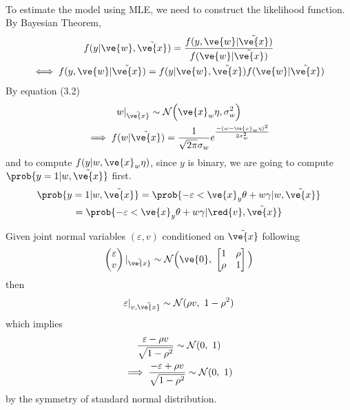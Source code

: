 \documentclass[11pt]{article}
\begin{document}
			\paragraph{}To estimate the model using MLE, we need to construct the likelihood function. By Bayesian Theorem,  
			\begin{gather}
				f(y|\ve{w}, \tilde{\ve{x}}) = \frac{f(y, \ve{w}|\tilde{\ve{x}})}{f(\ve{w}|\tilde{\ve{x}})} \\
				\iff f(y, \ve{w} | \tilde{\ve{x}}) = f(y|\ve{w}, \tilde{\ve{x}}) f(\ve{w}|\tilde{\ve{x}})
			\end{gather}
			By equation (3.2)
			\begin{gather}
				w|_{\tilde{\ve{x}}} \sim \mc{N} \Big(\ve{x}_w \eta, \sigma_w^2 \Big) \\
				\implies f(w|\tilde{\ve{x}}) = \frac{1}{\sqrt{2\pi}\sigma_w}e^{\frac{-(w - \ve{x}_w \eta)^2}{2\sigma_w^2}}
			\end{gather}
			and to compute $f(y|w, \ve{x}_w \eta)$, since $y$ is binary, we are going to compute $\prob{y=1|w, \tilde{\ve{x}}}$ first.
			\begin{gather}
				\prob{y=1|w, \tilde{\ve{x}}} = \prob{-\varepsilon < \ve{x}_y \theta + w \gamma | w, \tilde{\ve{x}}} \\
				= \prob{-\varepsilon < \ve{x}_y \theta + w \gamma | \red{v}, \tilde{\ve{x}}}
			\end{gather}
			\begin{lemma}
				Given joint normal variables $(\varepsilon, v)$ conditioned on $\tilde{\ve{x}}$ following
				\begin{equation}
					\begin{pmatrix} \varepsilon \\ v \end{pmatrix}\vert_{\tilde{\ve{x}}}
					\sim \mc{N}
					\Big(
					\ve{0},\ 
					\begin{bmatrix}1 & \rho \\ 
					\rho & 1\end{bmatrix}
					\Big)
				\end{equation}
				then 
				\begin{equation}
					\varepsilon|_{v, \tilde{\ve{x}}} \sim \mc{N}(\rho v,\ 1 - \rho^2)
				\end{equation}
				which implies
				\begin{gather}
					\frac{\varepsilon - \rho v}{\sqrt{1 - \rho^2}} \sim \mathcal{{N}}(0,\ 1) \\
					\implies \frac{- \varepsilon + \rho v}{\sqrt{1 - \rho^2}} \sim \mathcal{{N}}(0,\ 1)
				\end{gather}
				by the symmetry of standard normal distribution.
			\end{lemma}
\end{document}

